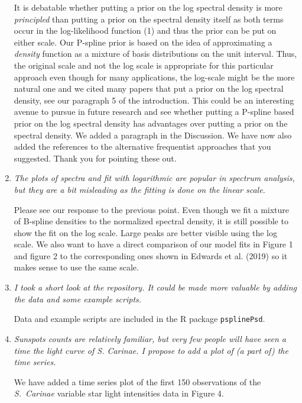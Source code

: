 \documentclass{scrartcl}
\newcommand{\refereeQuote}{\textit }
\newcommand{\response}{}
\begin{document}
\begin{enumerate}
\response{It is debatable whether putting a prior on the log spectral density is more {\em principled} than putting a prior on the spectral density itself as both terms occur in the log-likelihood function (1) and thus the prior can be put on either scale. Our P-spline prior is based on the idea of approximating  a {\em density} function as a mixture of basis distributions on the unit interval.
Thus, the original scale and not the log scale is appropriate for this particular approach even though for many applications, the log-scale might be the more natural one and we cited many papers that put a prior on the log spectral density, see our paragraph 5 of the introduction. This could be an interesting avenue to pursue in future research and see whether putting a P-spline based prior on the log spectral density has advantages over putting a prior on the spectral density. We added a paragraph in the Discussion. We have now also added the references to the alternative frequentist approaches that you suggested. Thank you for pointing these out.
}\bigskip




\item
\refereeQuote{The plots of spectra and fit with logarithmic are popular in spectrum analysis, but they are a bit misleading as the fitting is done on the linear scale.}\smallskip

\response{Please see our response to the previous point. Even though we fit a mixture of B-spline densities to the normalized spectral density, it is still possible to show the fit
on the log scale. Large peaks are better visible using the log scale. We also want to have a direct comparison of our model fits in Figure 1 and figure 2 to the corresponding ones shown  in Edwards et al. (2019) so it makes sense to use the same scale.}\bigskip

\item
\refereeQuote{I took a short look at the repository. It could be made more valuable by adding the data and some example scripts.}\smallskip

\response{Data and example scripts are included in the R package {\tt psplinePsd}.}\bigskip


\item
\refereeQuote{Sunspots counts are relatively familiar, but very few people will have seen a time the light curve of S. Carinae. I propose to add a plot of (a part of) the time series.}\smallskip

\response{We have added a time series plot of the first 150 observations of the \textit{S.\ Carinae} variable star light intensities data in Figure 4}.\bigskip



\end{enumerate}
\end{document}
